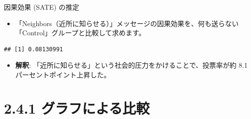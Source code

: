 \documentclass[
  ignorenonframetext,
]{beamer}
\newenvironment{Shaded}{\begin{snugshade}}{\end{snugshade}}
\newcommand{\CommentTok}[1]{\textcolor[rgb]{0.56,0.35,0.01}{\textit{#1}}}
\newcommand{\FunctionTok}[1]{\textcolor[rgb]{0.00,0.00,0.00}{#1}}
\newcommand{\NormalTok}[1]{#1}
\newcommand{\OtherTok}[1]{\textcolor[rgb]{0.56,0.35,0.01}{#1}}
\newcommand{\SpecialCharTok}[1]{\textcolor[rgb]{0.00,0.00,0.00}{#1}}
\newcommand{\StringTok}[1]{\textcolor[rgb]{0.31,0.60,0.02}{#1}}
\providecommand{\tightlist}{%
  \setlength{\itemsep}{0pt}\setlength{\parskip}{0pt}}
\begin{document}
\begin{frame}[fragile]{因果効果 (SATE) の推定}
\protect\hypertarget{ux56e0ux679cux52b9ux679c-sate-ux306eux63a8ux5b9a}{}
\begin{itemize}
\tightlist
\item
  「Neighbors（近所に知らせる）」メッセージの因果効果を、何も送らない「Control」グループと比較して求めます。
\end{itemize}

\scriptsize

\begin{Shaded}
\end{Shaded}

\begin{verbatim}
## [1] 0.08130991
\end{verbatim}

\normalsize

\begin{itemize}
\tightlist
\item
  \textbf{解釈}:
  「近所に知らせる」という社会的圧力をかけることで、投票率が約 8.1
  パーセントポイント上昇した。
\end{itemize}
\end{frame}

\hypertarget{ux30b0ux30e9ux30d5ux306bux3088ux308bux6bd4ux8f03}{%
\section{2.4.1
グラフによる比較}\label{ux30b0ux30e9ux30d5ux306bux3088ux308bux6bd4ux8f03}}
\end{document}
